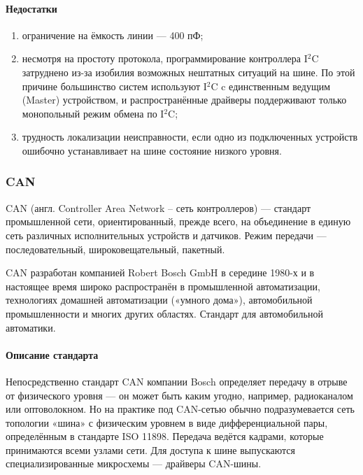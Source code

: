 \documentclass[a4paper,14pt]{extarticle}
\begin{document}
\begin{problem}
	\paragraph*{Недостатки}
	\begin{enumerate}
		\item ограничение на ёмкость линии — 400 пФ;
		\item несмотря на простоту протокола, программирование контроллера I${}^2$C затруднено из-за изобилия возможных нештатных ситуаций на шине. По этой причине большинство систем используют I${}^2$C c единственным ведущим (Master) устройством, и распространённые драйверы поддерживают только монопольный режим обмена по I${}^2$C;
		\item трудность локализации неисправности, если одно из подключенных устройств ошибочно устанавливает на шине состояние низкого уровня.
	\end{enumerate}
	\subsubsection*{CAN}
	CAN (англ. Controller Area Network -- сеть контроллеров) --- стандарт промышленной сети, ориентированный, прежде всего, на объединение в единую сеть различных исполнительных устройств и датчиков. Режим передачи — последовательный, широковещательный, пакетный.
	
	CAN разработан компанией Robert Bosch GmbH в середине 1980-х и в настоящее время широко распространён в промышленной автоматизации, технологиях домашней автоматизации («умного дома»), автомобильной промышленности и многих других областях. Стандарт для автомобильной автоматики.
	
	\paragraph*{Описание стандарта}
	Непосредственно стандарт CAN компании Bosch определяет передачу в отрыве от физического уровня — он может быть каким угодно, например, радиоканалом или оптоволокном. Но на практике под CAN-сетью обычно подразумевается сеть топологии «шина» с физическим уровнем в виде дифференциальной пары, определённым в стандарте ISO 11898. Передача ведётся кадрами, которые принимаются всеми узлами сети. Для доступа к шине выпускаются специализированные микросхемы — драйверы CAN-шины.
	

\end{problem}
\end{document}
